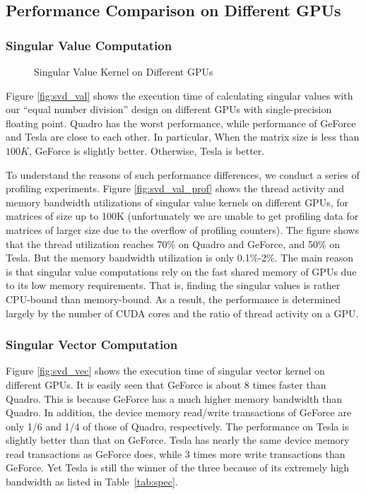 \subsection{Performance Comparison on Different GPUs}

\subsubsection{Singular Value Computation}
\begin{figure}[hbpt]
\vspace{-0.3in}
\centering
\vspace{-0.1in}
  \caption{Singular Value Kernel on Different GPUs}
  \label{fig:svdval}
\vspace{-0.3in}
\end{figure}

Figure \ref{fig:svd_val} shows the execution time of calculating singular values with our ``equal number division'' design on different GPUs with single-precision floating point.
Quadro has the worst performance, while performance of GeForce and Tesla are close to each other.
In particular, When the matrix size is less than $100K$, GeForce is slightly better. Otherwise, Tesla is better. 

To understand the reasons
of such performance differences, we conduct a series of profiling experiments.
Figure \ref{fig:svd_val_prof} shows the thread activity and memory bandwidth utilizations of singular value kernels on different GPUs, for matrices of size up to 
100K (unfortunately we are unable to get profiling data for matrices of larger size due to the overflow of profiling counters). 
The figure shows that the thread utilization reaches 70\% on Quadro and GeForce, and 50\% on Tesla. 
But the memory bandwidth utilization is only 0.1\%-2\%.
The main reason is that singular value computations rely on the fast shared memory
of GPUs due to its low memory requirements. That is, finding the singular
values is rather CPU-bound than memory-bound. 
As a result, the performance is determined largely by the number of CUDA cores and the ratio of thread activity on a GPU.

\subsubsection{Singular Vector Computation}
Figure \ref{fig:svd_vec} shows the execution time of singular vector kernel on different GPUs. 
It is easily seen that GeForce is about 8 times faster than
Quadro. This is because GeForce has a much higher memory bandwidth
than Quadro.
In addition, the device memory read/write transactions of GeForce are only 1/6 and 1/4 of those of Quadro, respectively.
The performance on Tesla is slightly better than that on GeForce.
Tesla has nearly the same device memory read transactions as GeForce does, while 3 times more write transactions than GeForce.
Yet Tesla is still the winner of the three because of its extremely high
bandwidth as listed in Table~\ref{tab:spec}.

